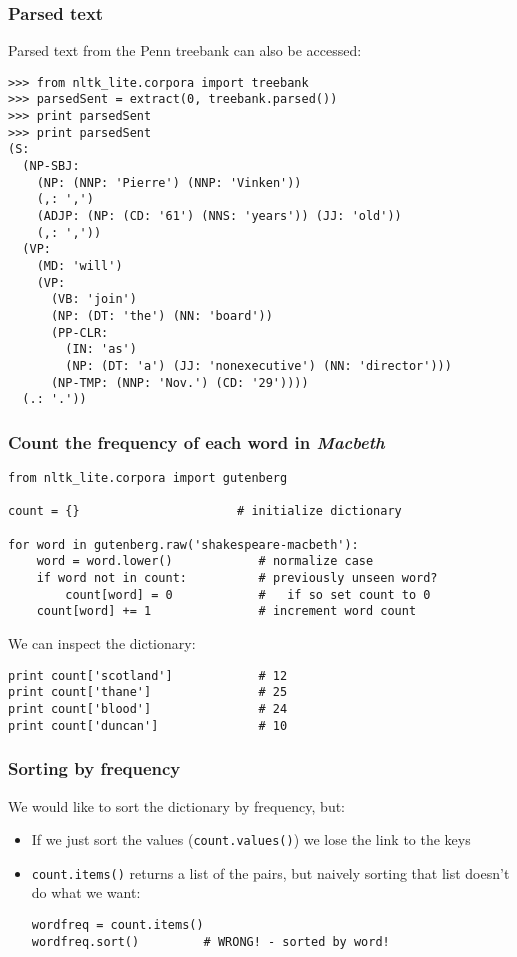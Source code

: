 \begin{frame}[fragile]
  \frametitle{Parsed text}

  Parsed text from the Penn treebank can also be accessed:
{\footnotesize
\begin{verbatim}
>>> from nltk_lite.corpora import treebank
>>> parsedSent = extract(0, treebank.parsed())
>>> print parsedSent
>>> print parsedSent
(S:
  (NP-SBJ:
    (NP: (NNP: 'Pierre') (NNP: 'Vinken'))
    (,: ',')
    (ADJP: (NP: (CD: '61') (NNS: 'years')) (JJ: 'old'))
    (,: ','))
  (VP:
    (MD: 'will')
    (VP:
      (VB: 'join')
      (NP: (DT: 'the') (NN: 'board'))
      (PP-CLR:
        (IN: 'as')
        (NP: (DT: 'a') (JJ: 'nonexecutive') (NN: 'director')))
      (NP-TMP: (NNP: 'Nov.') (CD: '29'))))
  (.: '.'))
\end{verbatim}}
\end{frame}


\begin{frame}[fragile]
  \frametitle{Count the frequency of each word in \emph{Macbeth}}
{\small
\begin{verbatim}
from nltk_lite.corpora import gutenberg

count = {}                      # initialize dictionary

for word in gutenberg.raw('shakespeare-macbeth'):    
    word = word.lower()            # normalize case
    if word not in count:          # previously unseen word?
        count[word] = 0            #   if so set count to 0
    count[word] += 1               # increment word count
\end{verbatim}}
\pause
We can inspect the dictionary:
{\small
\begin{verbatim}
print count['scotland']            # 12
print count['thane']               # 25
print count['blood']               # 24
print count['duncan']              # 10
\end{verbatim}}
\end{frame}

\begin{frame}[fragile]
  \frametitle{Sorting by frequency}

  We would like to sort the dictionary by frequency, but:


\begin{itemize}
  \item<1-> If we just sort the values (\texttt{count.values()}) we lose
    the link to the keys 
  \item<2-> \texttt{count.items()} returns a list of the pairs, but
    naively sorting that list doesn't do what we want:
\begin{verbatim}
wordfreq = count.items()   
wordfreq.sort()         # WRONG! - sorted by word!
\end{verbatim}
  \end{itemize}

  
\end{frame}

